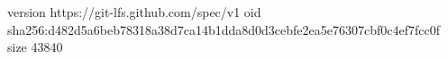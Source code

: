 version https://git-lfs.github.com/spec/v1
oid sha256:d482d5a6beb78318a38d7ca14b1dda8d0d3cebfe2ea5e76307cbf0c4ef7fcc0f
size 43840
